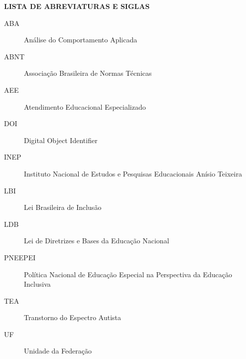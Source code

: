\clearpage

\begin{center}
\textbf{LISTA DE ABREVIATURAS E SIGLAS}
\end{center}

\begingroup
{}
\begin{description}
\item[ABA] Análise do Comportamento Aplicada
\item[ABNT] Associação Brasileira de Normas Técnicas
\item[AEE] Atendimento Educacional Especializado
\item[DOI] Digital Object Identifier
\item[INEP] Instituto Nacional de Estudos e Pesquisas Educacionais Anísio Teixeira
\item[LBI] Lei Brasileira de Inclusão
\item[LDB] Lei de Diretrizes e Bases da Educação Nacional
\item[PNEEPEI] Política Nacional de Educação Especial na Perspectiva da Educação Inclusiva
\item[TEA] Transtorno do Espectro Autista
\item[UF] Unidade da Federação
\end{description}
\endgroup

\clearpage
